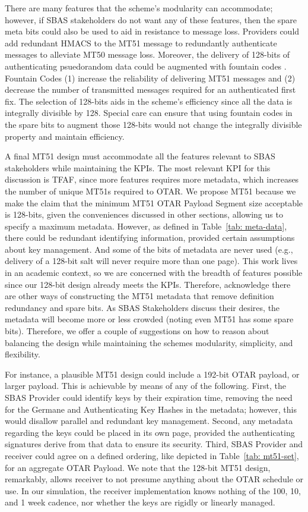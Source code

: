 \documentclass[letterpaper,times]{IONconf/IONconf}
\begin{document}
		There are many features that the scheme's modularity can accommodate; however, if SBAS stakeholders do not want any of these features, then the spare meta bits could also be used to aid in resistance to message loss.
		Providers could add redundant HMACS to the MT51 message to redundantly authenticate messages to alleviate MT50 message loss.
		Moreover, the delivery of 128-bits of authenticating psuedorandom data could be augmented with fountain codes \cite{gnss_fountain_codes}.
		Fountain Codes (1) increase the reliability of delivering MT51 messages and (2) decrease the number of transmitted messages required for an authenticated first fix.
		The selection of 128-bits aids in the scheme's efficiency since all the data is integrally divisible by 128.
		Special care can ensure that using fountain codes in the spare bits to augment those 128-bits would not change the integrally divisible property and maintain efficiency.

		A final MT51 design must accommodate all the features relevant to SBAS stakeholders while maintaining the KPIs.
		The most relevant KPI for this discussion is TFAF, since more features requires more metadata, which increases the number of unique MT51s required to OTAR.
		We propose MT51 because we make the claim that the minimum MT51 OTAR Payload Segment size acceptable is 128-bits, given the conveniences discussed in other sections, allowing us to specify a maximum metadata.
		However, as defined in Table~\ref{tab: meta-data}, there could be redundant identifying information, provided certain assumptions about key management.
		And some of the bits of metadata are never used (e.g., delivery of a 128-bit salt will never require more than one page).
		This work lives in an academic context, so we are concerned with the breadth of features possible since our 128-bit design already meets the KPIs.
		Therefore, acknowledge there are other ways of constructing the MT51 metadata that remove definition redundancy and spare bits.
		As SBAS Stakeholders discuss their desires, the metadata will become more or less crowded (noting even MT51 has some spare bits).
		Therefore, we offer a couple of suggestions on how to reason about balancing the design while maintaining the schemes modularity, simplicity, and flexibility.

		For instance, a plausible MT51 design could include a 192-bit OTAR payload, or larger payload.
		This is achievable by means of any of the following.
		First, the SBAS Provider could identify keys by their expiration time, removing the need for the Germane and Authenticating Key Hashes in the metadata; however, this would disallow parallel and redundant key management.
		Second, any metadata regarding the keys could be placed in its own page, provided the authenticating signatures derive from that data to ensure its security.
		Third, SBAS Provider and receiver could agree on a defined ordering, like depicted in Table~\ref{tab: mt51-set}, for an aggregate OTAR Payload.
		We note that the 128-bit MT51 design, remarkably, allows receiver to not presume anything about the OTAR schedule or use.
		In our simulation, the receiver implementation knows nothing of the 100, 10, and 1 week cadence, nor whether the keys are rigidly or linearly managed.
\end{document}

